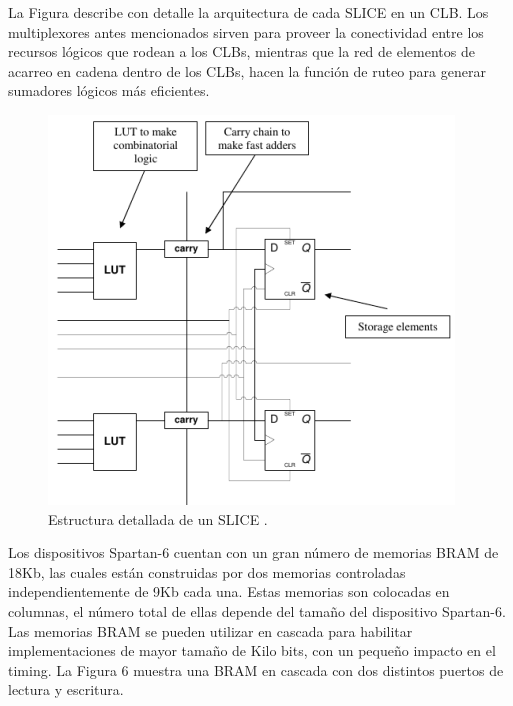 La Figura describe con detalle la arquitectura de cada SLICE en un
CLB. Los multiplexores antes mencionados sirven para proveer la conectividad
entre los recursos l\'{o}gicos que rodean a los CLBs, mientras que
la red de elementos de acarreo en cadena dentro de los CLBs, hacen
la funci\'{o}n de ruteo para generar sumadores l\'{o}gicos m\'{a}s
eficientes.

\begin{doublespace}
\begin{figure}[H]
\begin{centering}
\includegraphics[scale=0.9]{img/slice_struct}
\par\end{centering}
\caption{Estructura detallada de un SLICE \cite{clb_ov}.}

\end{figure}

\end{doublespace}

Los dispositivos Spartan-6 cuentan con un gran n\'{u}mero de memorias
BRAM de 18Kb, las cuales est\'{a}n construidas por dos memorias controladas
independientemente de 9Kb cada una. Estas memorias son colocadas en
columnas, el n\'{u}mero total de ellas depende del tama\~{n}o del
dispositivo Spartan-6. Las memorias BRAM se pueden utilizar en cascada
para habilitar implementaciones de mayor tama\~{n}o de Kilo bits,
con un peque\~{n}o impacto en el timing. La Figura 6 muestra una BRAM
en cascada con dos distintos puertos de lectura y escritura.

